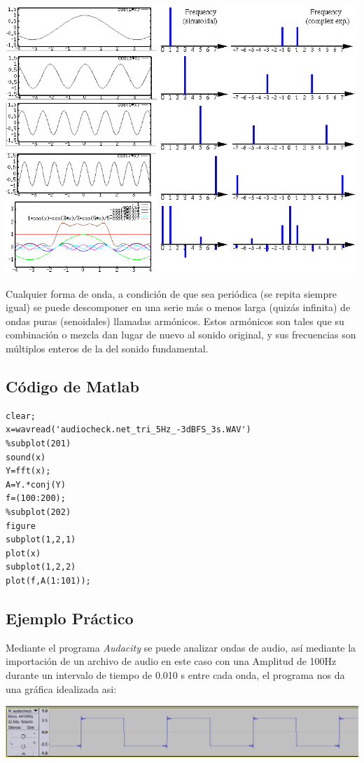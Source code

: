 \documentclass[10pt,a4paper]{book}
\begin{document}
\begin{center}
	\includegraphics[scale=0.45]{AudioFourier.png}\\
\end{center}

Cualquier forma de onda, a condición de que sea periódica (se repita siempre igual) se puede descomponer en una serie más o menos larga (quizás infinita) de ondas puras (senoidales) llamadas armónicos. Estos armónicos son tales que su combinación o mezcla dan lugar de nuevo al sonido original, y sus frecuencias son múltiplos enteros de la del sonido fundamental.\\

\subsection{Código de Matlab}

\begin{verbatim}
clear;
x=wavread('audiocheck.net_tri_5Hz_-3dBFS_3s.WAV')
%subplot(201)
sound(x)
Y=fft(x);
A=Y.*conj(Y)
f=(100:200);
%subplot(202)
figure
subplot(1,2,1)
plot(x)
subplot(1,2,2)
plot(f,A(1:101));
\end{verbatim}

\subsection{Ejemplo Práctico}

Mediante el programa \textit{Audacity} se puede analizar ondas de audio, así mediante la importación de un archivo de audio en este caso con una Amplitud de 100Hz durante un intervalo de tiempo de 0.010 s entre cada onda, el programa nos da una gráfica idealizada asi:
\begin{center}
	\includegraphics[scale=0.5]{Cuadrada.png} 
\end{center}
\end{document}

